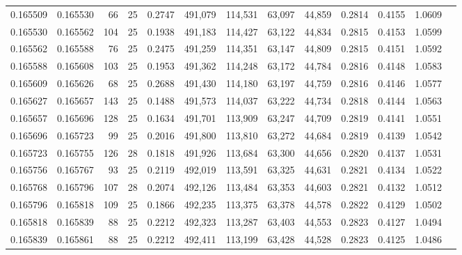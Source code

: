 \begin{tabular}{rrrrrrrrrrrrr}
0.165509 & 0.165530 &  66 &  25 &                                     0.2747 & 491,079 & 114,531 &  63,097 &  44,859 & 0.2814 & 0.4155 & 1.0609 \\
0.165530 & 0.165562 & 104 &  25 &                                     0.1938 & 491,183 & 114,427 &  63,122 &  44,834 & 0.2815 & 0.4153 & 1.0599 \\
0.165562 & 0.165588 &  76 &  25 &                                     0.2475 & 491,259 & 114,351 &  63,147 &  44,809 & 0.2815 & 0.4151 & 1.0592 \\
0.165588 & 0.165608 & 103 &  25 &                                     0.1953 & 491,362 & 114,248 &  63,172 &  44,784 & 0.2816 & 0.4148 & 1.0583 \\
0.165609 & 0.165626 &  68 &  25 &                                     0.2688 & 491,430 & 114,180 &  63,197 &  44,759 & 0.2816 & 0.4146 & 1.0577 \\
0.165627 & 0.165657 & 143 &  25 &                                     0.1488 & 491,573 & 114,037 &  63,222 &  44,734 & 0.2818 & 0.4144 & 1.0563 \\
0.165657 & 0.165696 & 128 &  25 &                                     0.1634 & 491,701 & 113,909 &  63,247 &  44,709 & 0.2819 & 0.4141 & 1.0551 \\
0.165696 & 0.165723 &  99 &  25 &                                     0.2016 & 491,800 & 113,810 &  63,272 &  44,684 & 0.2819 & 0.4139 & 1.0542 \\
0.165723 & 0.165755 & 126 &  28 &                                     0.1818 & 491,926 & 113,684 &  63,300 &  44,656 & 0.2820 & 0.4137 & 1.0531 \\
0.165756 & 0.165767 &  93 &  25 &                                     0.2119 & 492,019 & 113,591 &  63,325 &  44,631 & 0.2821 & 0.4134 & 1.0522 \\
0.165768 & 0.165796 & 107 &  28 &                                     0.2074 & 492,126 & 113,484 &  63,353 &  44,603 & 0.2821 & 0.4132 & 1.0512 \\
0.165796 & 0.165818 & 109 &  25 &                                     0.1866 & 492,235 & 113,375 &  63,378 &  44,578 & 0.2822 & 0.4129 & 1.0502 \\
0.165818 & 0.165839 &  88 &  25 &                                     0.2212 & 492,323 & 113,287 &  63,403 &  44,553 & 0.2823 & 0.4127 & 1.0494 \\
0.165839 & 0.165861 &  88 &  25 &                                     0.2212 & 492,411 & 113,199 &  63,428 &  44,528 & 0.2823 & 0.4125 & 1.0486 \\

\end{tabular}
